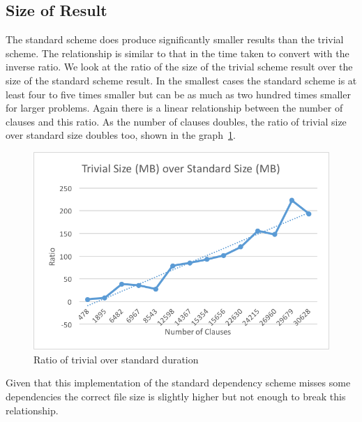 \subsection{Size of Result}
The standard scheme does produce significantly smaller results than the trivial scheme. The relationship is similar to that in the time taken to convert with the inverse ratio. We look at the ratio of the size of the trivial scheme result over the size of the standard scheme result. In the smallest cases the standard scheme is at least four to five times smaller but can be as much as two hundred times smaller for larger problems. Again there is a linear relationship between the number of clauses and this ratio. As the number of clauses doubles, the ratio of trivial size over standard size doubles too, shown in the graph~\ref{trivialsizeoverstandardsize}.

\begin{figure}[h]
\caption{Ratio of trivial over standard duration}
\label{trivialsizeoverstandardsize}
\begin{CenteredBox}
\includegraphics{trivialsizeoverstandardsize.png}
\end{CenteredBox}
\end{figure}

Given that this implementation of the standard dependency scheme misses some dependencies the correct file size is slightly higher but not enough to break this relationship.

